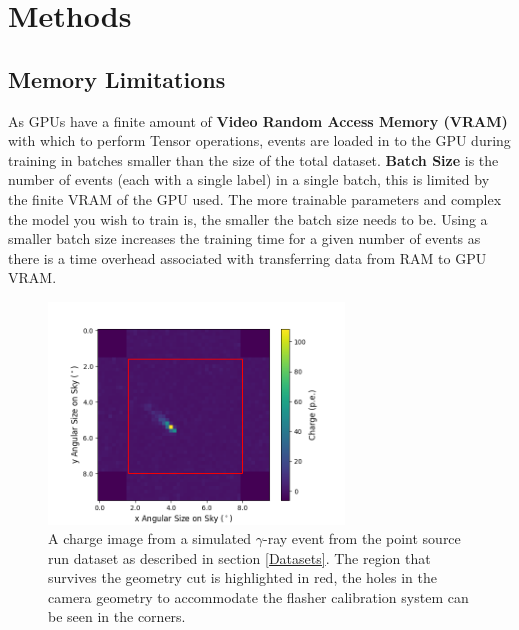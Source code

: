 \section{Methods} \label{Methods}
\subsection{Memory Limitations}
As GPUs have a finite amount of \textbf{Video Random Access Memory (VRAM)} with which to perform Tensor operations, events are loaded in to the GPU during training in batches smaller than the size of the total dataset. \textbf{Batch Size} is the number of events (each with a single label) in a single batch, this is limited by the finite VRAM of the GPU used. The more trainable parameters and complex the model you wish to train is, the smaller the batch size needs to be. Using a smaller batch size increases the training time for a given number of events as there is a time overhead associated with transferring data from RAM to GPU VRAM. 
 
\begin{figure}
  \centering
  \includegraphics[width=0.7\textwidth]{figures/gammacut.png}
  \caption{A charge image from a simulated $\gamma$-ray event from the point source run dataset as described in section \ref{Datasets}. The region that survives the geometry cut is highlighted in red, the holes in the camera geometry to accommodate the flasher calibration system can be seen in the corners.}
  \label{fig:gammacut}
\end{figure}

